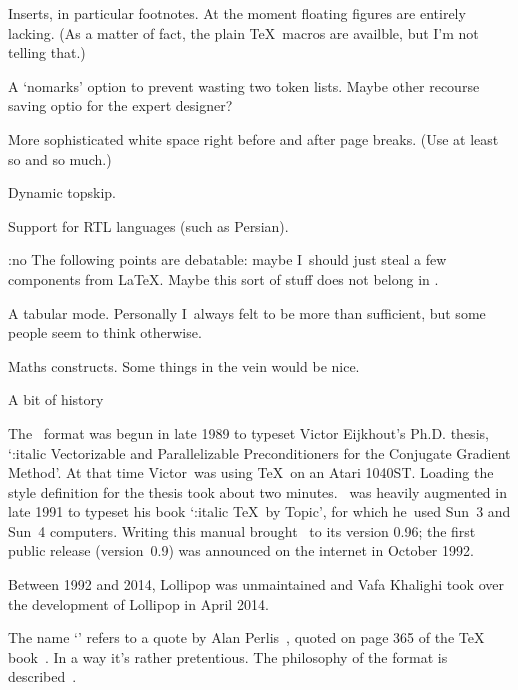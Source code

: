 \item Inserts, in particular footnotes. At the moment floating
figures are entirely lacking. (As a matter of fact, the plain \TeX\
macros are availble, but I'm not telling that.)

\item A `nomarks' option to prevent wasting two token lists.
Maybe other recourse saving optio for the expert designer?

\item More sophisticated white space right before and after
page breaks. (Use at least so and so much.)

\item Dynamic topskip.

\item Sup­port for RTL lan­guages (such as Per­sian).


{\PopIndentLevel\Indent:no The following points are debatable:
maybe I~should just steal a few components from \LaTeX. Maybe this
sort of stuff does not belong in \Lollipop.\par}

\item A tabular mode. Personally I~always felt  to be more
than sufficient, but some people seem to think otherwise.

\item Maths constructs. Some things in the  vein would be
nice.

\>

\SubSection A bit of history

The \Lollipop\ format was begun in late 1989 to typeset Victor Eijkhout's Ph.D.
thesis, `{\Style:italic Vectorizable and Parallelizable
Preconditioners for the Conjugate Gradient Method}'. At that time 
Victor~was using \TeX\ on an Atari 1040ST.
Loading the style definition for the thesis took about two minutes.
\Lollipop\ was heavily augmented in late 1991 to typeset his book
`{\Style:italic \TeX\ by Topic}', for which he~used Sun~3 and Sun~4
computers. Writing this manual brought \Lollipop\ to its version 0.96; the first public release (version~0.9) was announced on the
internet in October 1992. 

Between 1992 and 2014, Lollipop was unmaintained and Vafa Khalighi took over the
development of Lollipop in April 2014.

The name `' refers to a quote by Alan
Perlis~\bibref[Pe:epigrams], quoted on page 365 of the \TeX
book~\bibref[Kn:book]. In a way it's rather pretentious. The philosophy
of the \n{Lollipop} format is described~\bibref[EL:Cork,E:Portland].

\endinput

